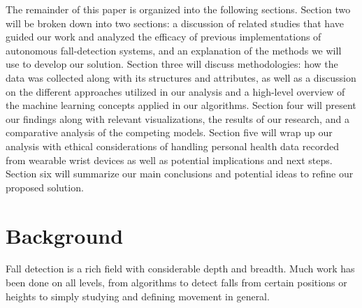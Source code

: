 \documentclass{llncs}
\begin{document}

	The remainder of this paper is organized into the following sections. Section two will be broken down into two sections: a discussion of related studies that have guided our work and analyzed the efficacy of previous implementations of autonomous fall-detection systems, and an explanation of the methods we will use to develop our solution. Section three will discuss methodologies: how the data was collected along with its structures and attributes, as well as a discussion on the different approaches utilized in our analysis and a high-level overview of the machine learning concepts applied in our algorithms. Section four will present our findings along with relevant visualizations, the results of our research, and a comparative analysis of the competing models. Section five will wrap up our analysis with ethical considerations of handling personal health data recorded from wearable wrist devices as well as potential implications and next steps. Section six will summarize our main conclusions and potential ideas to refine our proposed solution. 

\section{Background}
Fall detection is a rich field with considerable depth and breadth. Much work has been done on all levels, from algorithms to detect falls from certain positions or heights to simply studying and defining movement in general.
\end{document}
